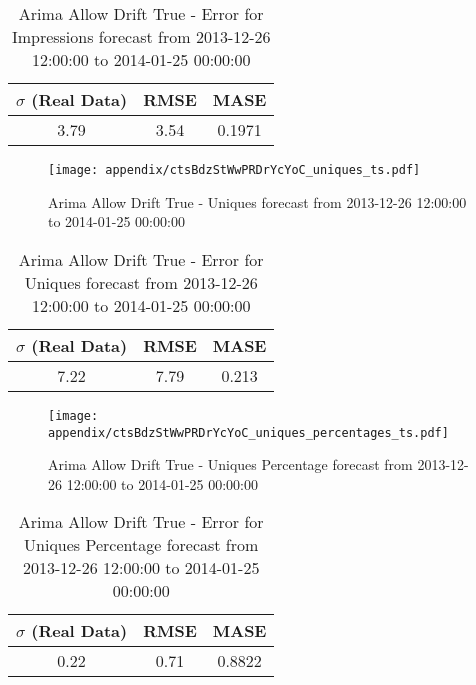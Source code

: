 \begin{table}[H]
\centering
\footnotesize
\begin{tabular}{ccc}
$\sigma$ (Real Data) & RMSE & MASE   \\ \hline
3.79 & 3.54 & 0.1971 \\
\end{tabular}

\vspace{0.5cm}

\caption{
Arima Allow Drift True - Error for Impressions forecast from 2013-12-26 12:00:00 to 2014-01-25 00:00:00}
\end{table}

\begin{figure}[H] \begin{center} \leavevmode
\texttt{[image: appendix/ctsBdzStWwPRDrYcYoC\_uniques\_ts.pdf]} \caption{
Arima Allow Drift True - Uniques forecast from 2013-12-26 12:00:00 to 2014-01-25 00:00:00} \label{fig:appendix/ctsBdzStWwPRDrYcYoC_uniques_ts.pdf} \end{center}
\end{figure}

\begin{table}[H]
\centering
\footnotesize
\begin{tabular}{ccc}
$\sigma$ (Real Data) & RMSE & MASE   \\ \hline
7.22 & 7.79 & 0.213 \\
\end{tabular}

\vspace{0.5cm}

\caption{
Arima Allow Drift True - Error for Uniques forecast from 2013-12-26 12:00:00 to 2014-01-25 00:00:00}
\end{table}

\begin{figure}[H] \begin{center} \leavevmode
\texttt{[image: appendix/ctsBdzStWwPRDrYcYoC\_uniques\_percentages\_ts.pdf]} \caption{
Arima Allow Drift True - Uniques Percentage forecast from 2013-12-26 12:00:00 to 2014-01-25 00:00:00} \label{fig:appendix/ctsBdzStWwPRDrYcYoC_uniques_percentages_ts.pdf} \end{center}
\end{figure}

\begin{table}[H]
\centering
\footnotesize
\begin{tabular}{ccc}
$\sigma$ (Real Data) & RMSE & MASE   \\ \hline
0.22 & 0.71 & 0.8822 \\
\end{tabular}

\vspace{0.5cm}

\caption{
Arima Allow Drift True - Error for Uniques Percentage forecast from 2013-12-26 12:00:00 to 2014-01-25 00:00:00}
\end{table}

